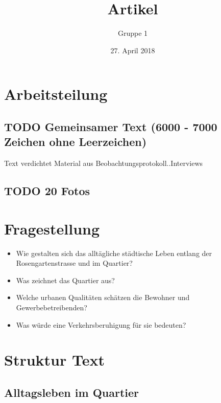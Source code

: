 \documentclass[a4paper,ngerman,11pt]{scrartcl}
\author{Gruppe 1}
\date{27. April 2018}
\title{Artikel}
\begin{document}
\maketitle
\tableofcontents



\section{Arbeitsteilung}
\label{sec-1}

\subsection{{\bfseries\sffamily TODO} Gemeinsamer Text (6000 - 7000 Zeichen ohne Leerzeichen)}
\label{sec-1-1}

Text verdichtet Material aus Beobachtungsprotokoll..Interviews

\subsection{{\bfseries\sffamily TODO} 20 Fotos}
\label{sec-1-2}

\section{Fragestellung}
\label{sec-2}

\begin{itemize}
\item Wie gestalten sich das alltägliche städtische Leben entlang der
Rosengartenstrasse und im Quartier?

\item Was zeichnet das Quartier aus?

\item Welche urbanen Qualitäten schätzen die Bewohner und Gewerbebetreibenden?

\item Was würde eine Verkehrsberuhigung für sie bedeuten?
\end{itemize}

\section{Struktur Text}
\label{sec-3}

\subsection{Alltagsleben im Quartier}
\label{sec-3-1}
\end{document}
